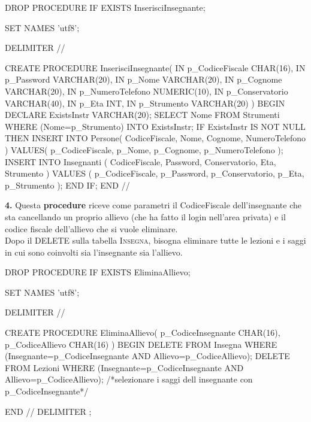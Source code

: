 \documentclass{article}
\begin{document}
\begin{sql}
DROP PROCEDURE IF EXISTS InserisciInsegnante;

SET NAMES 'utf8';

DELIMITER //

CREATE PROCEDURE InserisciInsegnante(
			IN p_CodiceFiscale CHAR(16),
			IN p_Password	   VARCHAR(20),
			IN p_Nome	   VARCHAR(20),
			IN p_Cognome	   VARCHAR(20),
			IN p_NumeroTelefono NUMERIC(10),
			IN p_Conservatorio VARCHAR(40),
			IN p_Eta	   INT,
			IN p_Strumento	   VARCHAR(20)	
		)
BEGIN
	DECLARE ExistsInstr VARCHAR(20);
	SELECT Nome FROM Strumenti WHERE (Nome=p_Strumento) INTO ExistsInstr;
	IF ExistsInstr IS NOT NULL THEN
		INSERT INTO Persone(
			CodiceFiscale,
			Nome,
			Cognome,
			NumeroTelefono
		)
		VALUES(
			p_CodiceFiscale,
			p_Nome,
			p_Cognome,
			p_NumeroTelefono
		);
                INSERT INTO Insegnanti
                   (
                        CodiceFiscale,
                        Password,
                        Conservatorio,
			Eta,
			Strumento
                   )
                   VALUES
                   (
                        p_CodiceFiscale,
			p_Password,
                        p_Conservatorio,
                        p_Eta,
			p_Strumento
                   );
	END IF;
END //
\end{sql}

\bigskip

\begin{flushleft}
\textbf{4.} Questa \textbf{procedure} riceve come parametri il CodiceFiscale dell'insegnante che sta 
cancellando un proprio allievo (che ha fatto il login nell'area privata) e il codice fiscale dell'allievo che si vuole eliminare.\\
Dopo il DELETE sulla tabella \textsc{Insegna}, bisogna eliminare tutte le lezioni e i saggi in cui
sono coinvolti sia l'insegnante sia l'allievo.
\end{flushleft}

\begin{sql}
DROP PROCEDURE IF EXISTS EliminaAllievo;

SET NAMES 'utf8';

DELIMITER //

CREATE PROCEDURE EliminaAllievo(
	           p_CodiceInsegnante CHAR(16),
		   p_CodiceAllievo    CHAR(16)
		)
BEGIN	
	    DELETE FROM Insegna WHERE (Insegnante=p_CodiceInsegnante AND Allievo=p_CodiceAllievo);
	    DELETE FROM Lezioni WHERE (Insegnante=p_CodiceInsegnante AND Allievo=p_CodiceAllievo);
/*selezionare i saggi dell insegnante con p_CodiceInsegnante*/

END //
DELIMITER ;
\end{sql}
\end{document}
